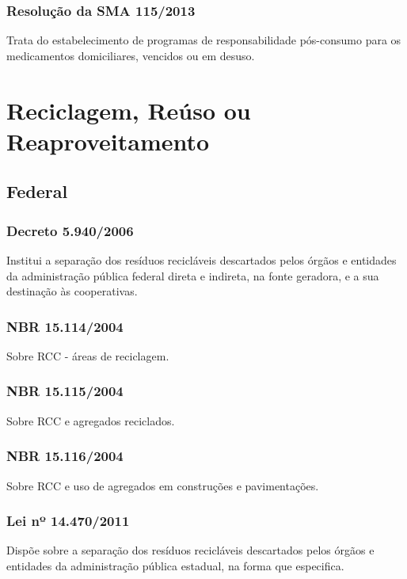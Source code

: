 \begin{subapend}
\begin{subsubapend}
		\subsubsection{Resolução da SMA 115/2013}
		Trata do estabelecimento de programas de responsabilidade pós-consumo para os medicamentos domiciliares, vencidos ou em desuso.
	\end{subsubapend}
\end{subapend}

\section{Reciclagem, Reúso ou Reaproveitamento}

\begin{subapend}
	\subsection{Federal}
	\begin{subsubapend}
		\subsubsection{Decreto 5.940/2006}
		Institui a separação dos resíduos recicláveis descartados pelos órgãos e entidades da administração pública federal direta e indireta, na fonte geradora, e a sua destinação às cooperativas.
		\subsubsection{NBR 15.114/2004}
		Sobre RCC - áreas de reciclagem.
		\subsubsection{NBR 15.115/2004}
		Sobre RCC e agregados reciclados.
		\subsubsection{NBR 15.116/2004}
		Sobre RCC e uso de agregados em construções e pavimentações.
		\subsubsection{Lei nº 14.470/2011}
		Dispõe sobre a separação dos resíduos recicláveis descartados pelos órgãos e entidades da administração pública estadual, na forma que especifica.
	\end{subsubapend}
\end{subapend}



